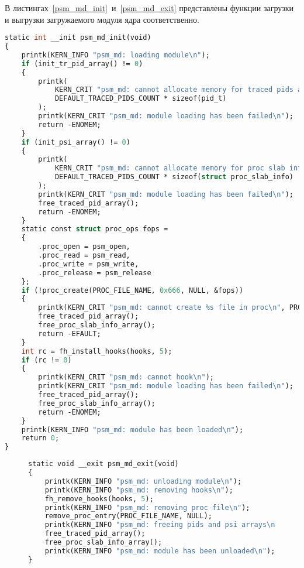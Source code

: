 В листингах~\ref{psm_md_init}~и~\ref{psm_md_exit} представлены функции загрузки и выгрузки загружаемого модуля ядра соответственно.
	\begin{lstlisting}[label=psm_md_init,caption=Функция загрузки ядра,language=Caml]
static int __init psm_md_init(void)
{
	printk(KERN_INFO "psm_md: loading module\n");
	if (init_tr_pid_array() != 0)
	{
		printk(
			KERN_CRIT "psm_md: cannot allocate memory for traced pids array (size %zu)\n",
			DEFAULT_TRACED_PIDS_COUNT * sizeof(pid_t)
		);
		printk(KERN_CRIT "psm_md: module loading has been failed\n");
		return -ENOMEM;
	}
	if (init_psi_array() != 0)
	{
		printk(
			KERN_CRIT "psm_md: cannot allocate memory for proc slab info array (size %zu)\n",
			DEFAULT_TRACED_PIDS_COUNT * sizeof(struct proc_slab_info)
		);
		printk(KERN_CRIT "psm_md: module loading has been failed\n");
		free_traced_pid_array();
		return -ENOMEM;
	}
	static const struct proc_ops fops =
	{
		.proc_open = psm_open,
		.proc_read = psm_read,
		.proc_write = psm_write,
		.proc_release = psm_release
	};
	if (!proc_create(PROC_FILE_NAME, 0x666, NULL, &fops))
	{
		printk(KERN_CRIT "psm_md: cannot create %s file in proc\n", PROC_FILE_NAME);
		free_traced_pid_array();
		free_proc_slab_info_array();
		return -EFAULT;
	}
	int rc = fh_install_hooks(hooks, 5);
	if (rc != 0)
	{
		printk(KERN_CRIT "psm_md: cannot hook\n");
		printk(KERN_CRIT "psm_md: module loading has been failed\n");
		free_traced_pid_array();
		free_proc_slab_info_array();
		return -ENOMEM;
	}
	printk(KERN_INFO "psm_md: module has been loaded\n");
	return 0;
}
	\end{lstlisting}
\begin{figure}[H]
\begin{lstlisting}[label=psm_md_exit,caption=Функция выгрузки ядра,language=Caml]
static void __exit psm_md_exit(void)
{
	printk(KERN_INFO "psm_md: unloading module\n");
	printk(KERN_INFO "psm_md: removing hooks\n");
	fh_remove_hooks(hooks, 5);
	printk(KERN_INFO "psm_md: removing proc file\n");
	remove_proc_entry(PROC_FILE_NAME, NULL);
	printk(KERN_INFO "psm_md: freeing pids and psi arrays\n");
	free_traced_pid_array();
	free_proc_slab_info_array();
	printk(KERN_INFO "psm_md: module has been unloaded\n");
}
\end{lstlisting}
\end{figure}

